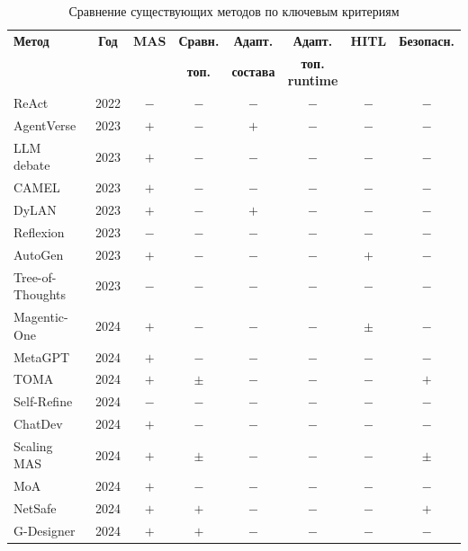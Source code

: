 \begin{table}[!htbp]
\footnotesize
\caption{Сравнение существующих методов по ключевым критериям}
\label{tab:rev:methods}
\footnotesize
\begin{tabularx}{\textwidth}{l c c c c c c c}
\toprule
\textbf{Метод} & \textbf{Год} & \textbf{MAS} & \textbf{Сравн.}
& \textbf{Адапт.} & \textbf{Адапт.} & \textbf{HITL} & \textbf{Безопасн.} \\
& & & \textbf{топ.} & \textbf{состава} & \textbf{топ. runtime} & & \\
\midrule
ReAct~\cite{react2022}             & 2022 & $-$ & $-$ & $-$ & $-$ & $-$ & $-$ \\
AgentVerse~\cite{agentverse2023}   & 2023 & $+$ & $-$ & $+$ & $-$ & $-$ & $-$ \\
LLM debate~\cite{du2023}           & 2023 & $+$ & $-$ & $-$ & $-$ & $-$ & $-$ \\
CAMEL~\cite{camel2023}             & 2023 & $+$ & $-$ & $-$ & $-$ & $-$ & $-$ \\
DyLAN~\cite{liu2023}               & 2023 & $+$ & $-$ & $+$ & $-$ & $-$ & $-$ \\
Reflexion~\cite{reflexion2023}     & 2023 & $-$ & $-$ & $-$ & $-$ & $-$ & $-$ \\
AutoGen~\cite{wu2023}              & 2023 & $+$ & $-$ & $-$ & $-$ & $+$ & $-$ \\
Tree-of-Thoughts~\cite{tot2023}    & 2023 & $-$ & $-$ & $-$ & $-$ & $-$ & $-$ \\
Magentic-One~\cite{magenticone2024}& 2024 & $+$ & $-$ & $-$ & $-$ & $\pm$ & $-$ \\
MetaGPT~\cite{hong2024}            & 2024 & $+$ & $-$ & $-$ & $-$ & $-$ & $-$ \\
TOMA~\cite{liang2024}              & 2024 & $+$ & $\pm$ & $-$ & $-$ & $-$ & $+$ \\
Self-Refine~\cite{selfrefine2024}  & 2024 & $-$ & $-$ & $-$ & $-$ & $-$ & $-$ \\
ChatDev~\cite{qian2024}            & 2024 & $+$ & $-$ & $-$ & $-$ & $-$ & $-$ \\
Scaling MAS~\cite{qian2024scaling} & 2024 & $+$ & $\pm$ & $-$ & $-$ & $-$ & $\pm$ \\
MoA~\cite{moa2024}                 & 2024 & $+$ & $-$ & $-$ & $-$ & $-$ & $-$ \\
NetSafe~\cite{yu2024}              & 2024 & $+$ & $+$ & $-$ & $-$ & $-$ & $+$ \\
G-Designer~\cite{zhang2024}        & 2024 & $+$ & $+$ & $-$ & $-$ & $-$ & $-$ \\

\end{tabularx}
\end{table}
